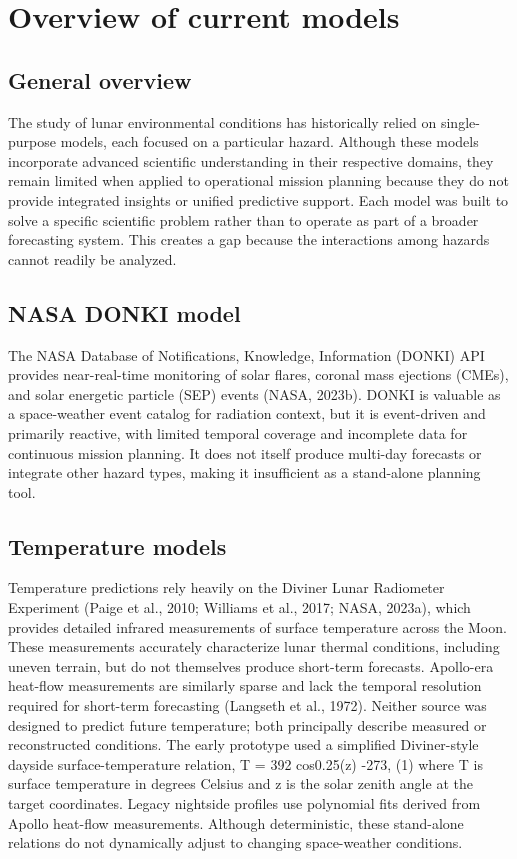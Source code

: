 \section{Overview of current models}

\subsection{General overview}

The study of lunar environmental conditions has historically relied on single-purpose models, each focused on a particular hazard. Although these models incorporate advanced scientific understanding in their respective domains, they remain limited when applied to operational mission planning because they do not provide integrated insights or unified predictive support. Each model was built to solve a specific scientific problem rather than to operate as part of a broader forecasting system. This creates a gap because the interactions among hazards cannot readily be analyzed.

\subsection{NASA DONKI model}

The NASA Database of Notifications, Knowledge, Information (DONKI) API provides near-real-time monitoring of solar flares, coronal mass ejections (CMEs), and solar energetic particle (SEP) events (NASA, 2023b). DONKI is valuable as a space-weather event catalog for radiation context, but it is event-driven and primarily reactive, with limited temporal coverage and incomplete data for continuous mission planning. It does not itself produce multi-day forecasts or integrate other hazard types, making it insufficient as a stand-alone planning tool.

\subsection{Temperature models}

Temperature predictions rely heavily on the Diviner Lunar Radiometer Experiment (Paige et al., 2010; Williams et al., 2017; NASA, 2023a), which provides detailed infrared measurements of surface temperature across the Moon. These measurements accurately characterize lunar thermal conditions, including uneven terrain, but do not themselves produce short-term forecasts. Apollo-era heat-flow measurements are similarly sparse and lack the temporal resolution required for short-term forecasting (Langseth et al., 1972). Neither source was designed to predict future temperature; both principally describe measured or reconstructed conditions. The early prototype used a simplified Diviner-style dayside surface-temperature relation, T = 392 cos0.25(z) -273, (1) where T is surface temperature in degrees Celsius and z is the solar zenith angle at the target coordinates. Legacy nightside profiles use polynomial fits derived from Apollo heat-flow measurements. Although deterministic, these stand-alone relations do not dynamically adjust to changing space-weather conditions.

